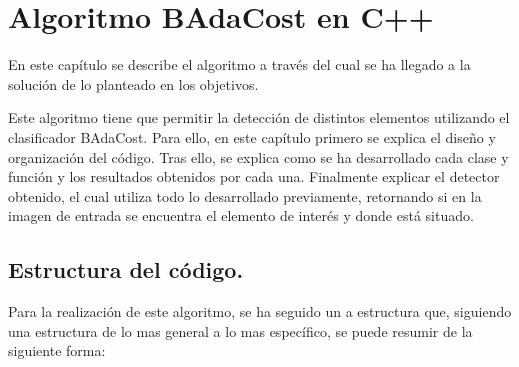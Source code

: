 \chapter{Algoritmo BAdaCost en C++}\label{cap.algoritmo} 
En este capítulo se describe el algoritmo a través del cual se ha llegado a la solución de lo planteado en los objetivos.

Este algoritmo tiene que permitir la detección de distintos elementos utilizando el clasificador BAdaCost. Para ello, en este capítulo primero se explica el diseño y organización del código. Tras ello, se explica como se ha desarrollado cada clase y función y los resultados obtenidos por cada una. Finalmente explicar el detector obtenido, el cual utiliza todo lo desarrollado previamente, retornando si en la imagen de entrada se encuentra el elemento de interés y donde está situado.

\section{Estructura del código.}

Para la realización de este algoritmo, se ha seguido un a estructura que, siguiendo una estructura de lo mas general a lo mas específico, se puede resumir de la siguiente forma:

